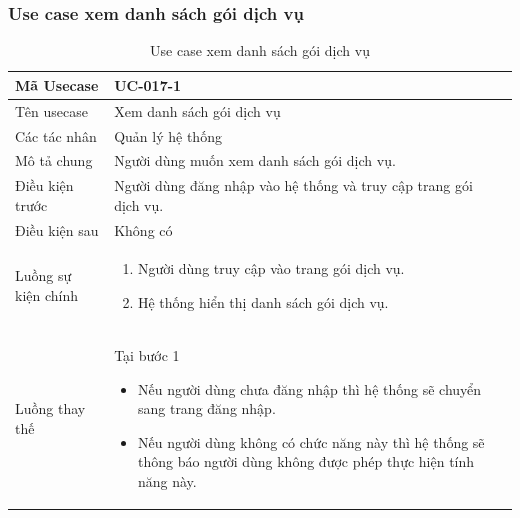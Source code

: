 \documentclass[12pt,a4paper]{article}
\begin{document}
    \subsubsection*{Use case xem danh sách gói dịch vụ }
    \begin{table}[H]
        \centering
        \begin{tabular}{|p{3.5cm}|p{11.5cm}|c|}
            \hline
            Mã Usecase      & UC-017-1                                                         \\
            \hline
            Tên usecase     & Xem danh sách gói dịch vụ                                        \\
            \hline
            Các tác nhân    & Quản lý hệ thống                                                 \\
            \hline
            Mô tả chung     & Người dùng muốn xem danh sách gói dịch vụ.                       \\
            \hline

            Điều kiện trước & Người dùng đăng nhập vào hệ thống và truy cập trang gói dịch vụ. \\
            \hline

            Điều kiện sau   & Không có                                                         \\
            \hline

            Luồng sự kiện chính & \vspace{-.8cm}\begin{enumerate}
                                                    \item Người dùng truy cập vào trang gói dịch vụ.
                                                    \item Hệ thống hiển thị danh sách gói dịch vụ.
            \end{enumerate}
            \\
            \hline
            Luồng thay thế & Tại bước 1\newline
            \vspace{-.8cm}\begin{itemize}
                              \item Nếu người dùng chưa đăng nhập thì hệ thống sẽ chuyển sang trang đăng nhập.
                              \item  Nếu người dùng không có chức năng này thì hệ thống sẽ thông báo người dùng không được phép thực hiện tính năng này.
            \end{itemize}

            \\    \hline
        \end{tabular}
        \caption{Use case xem danh sách gói dịch vụ }
    \end{table}
\end{document}
